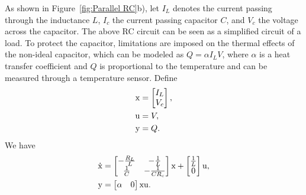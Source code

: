As shown in Figure~\ref{fig:Parallel RC}b), let $I_L$ denotes the current passing through the inductance $L$,  $I_c$ the current passing capacitor $C$, and $V_c$ the voltage across the capacitor. The above RC circuit can be seen as a simplified circuit of a load. To protect the capacitor, limitations are imposed on the thermal effects of the non-ideal capacitor, which can be modeled as $Q = \alpha I_L V$, where $\alpha$ is a heat transfer coefficient and $Q$ is proportional to the temperature and can be measured through a temperature sensor. Define 
\begin{equation}
\begin{split}
    { \mathrm{x} } &= \begin{bmatrix}
    I_L \\ V_c \end{bmatrix},\\
    { \mathrm{u} }  &= V, \\
    { \mathrm{y} } &= Q.\\
\end{split}
\end{equation}
We have %
\begin{equation}\label{eq:RC circuit}
\begin{split}
    \dot{{ \mathrm{x} }} &= \begin{bmatrix}
        -\frac{R_L}{L} & -\frac{1}{L} \\
        \frac{1}{C} & -\frac{1}{CR_c} \\
    \end{bmatrix} { \mathrm{x} } + \begin{bmatrix}
        \frac{1}{L} \\ 0
    \end{bmatrix} { \mathrm{u} }, \\
    { \mathrm{y} } &= \begin{bmatrix}
        \alpha & 0
    \end{bmatrix} { \mathrm{x} } { \mathrm{u} }.\\
\end{split}
\end{equation}
